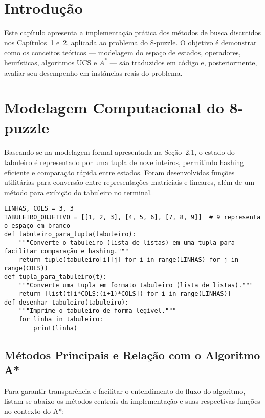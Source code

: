\section{Introdução}  
Este capítulo apresenta a implementação prática dos métodos de busca discutidos nos Capítulos~1 e~2, aplicada ao problema do 8-puzzle. O objetivo é demonstrar como os conceitos teóricos — modelagem do espaço de estados, operadores, heurísticas, algoritmos UCS e $A^*$ — são traduzidos em código e, posteriormente, avaliar seu desempenho em instâncias reais do problema.  
  
\section{Modelagem Computacional do 8-puzzle}  
Baseando-se na modelagem formal apresentada na Seção~2.1, o estado do tabuleiro é representado por uma tupla de nove inteiros, permitindo hashing eficiente e comparação rápida entre estados. Foram desenvolvidas funções utilitárias para conversão entre representações matriciais e lineares, além de um método para exibição do tabuleiro no terminal.  
\begin{verbatim}  
LINHAS, COLS = 3, 3  
TABULEIRO_OBJETIVO = [[1, 2, 3], [4, 5, 6], [7, 8, 9]]  # 9 representa o espaço em branco  
def tabuleiro_para_tupla(tabuleiro):  
    """Converte o tabuleiro (lista de listas) em uma tupla para facilitar comparação e hashing."""  
    return tuple(tabuleiro[i][j] for i in range(LINHAS) for j in range(COLS))  
def tupla_para_tabuleiro(t):  
    """Converte uma tupla em formato tabuleiro (lista de listas)."""  
    return [list(t[i*COLS:(i+1)*COLS]) for i in range(LINHAS)]  
def desenhar_tabuleiro(tabuleiro):  
    """Imprime o tabuleiro de forma legível."""  
    for linha in tabuleiro:  
        print(linha)  
\end{verbatim}  
  
\subsection{Métodos Principais e Relação com o Algoritmo A*}  
Para garantir transparência e facilitar o entendimento do fluxo do algoritmo, listam-se abaixo os métodos centrais da implementação e suas respectivas funções no contexto do A*:  
  
